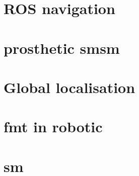 \section{ROS navigation}
  

\section{prosthetic smsm}

\section{Global localisation}

\section{fmt in robotic}

\section{sm}
